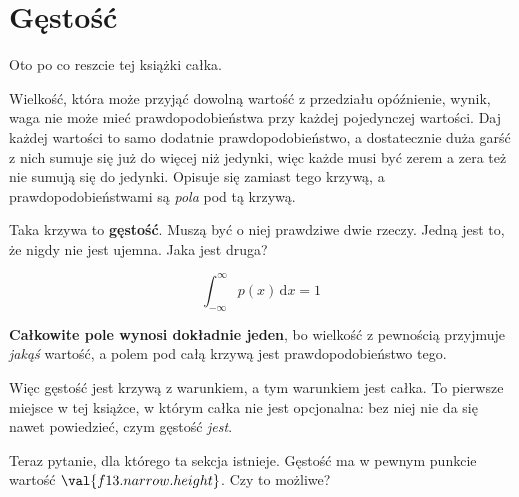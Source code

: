 \section{Gęstość}
\label{sec:F13-density}

\begin{fr}
Oto po co reszcie tej książki całka.

Wielkość, która może przyjąć dowolną wartość z przedziału \dash{} opóźnienie,
wynik, waga \dash{} nie może mieć prawdopodobieństwa przy każdej pojedynczej
wartości. Daj każdej wartości to samo dodatnie prawdopodobieństwo, a
dostatecznie duża garść z nich sumuje się już do więcej niż jedynki, więc
każde musi być zerem \dash{} a zera też nie sumują się do jedynki. Opisuje się
zamiast tego krzywą, a prawdopodobieństwami są \emph{pola} pod tą krzywą.

Taka krzywa to \textbf{gęstość}. Muszą być o niej prawdziwe dwie rzeczy. Jedną
jest to, że nigdy nie jest ujemna. Jaka jest druga?
\nextframe
\end{fr}

\begin{fr}
\begin{ansblock}
\[ \int_{-\infty}^{\infty} p(x)\,\mathrm{d}x = 1 \]
\end{ansblock}

\textbf{Całkowite pole wynosi dokładnie jeden}, bo wielkość z pewnością
przyjmuje \emph{jakąś} wartość, a polem pod całą krzywą jest
prawdopodobieństwo tego.

Więc gęstość jest krzywą z warunkiem, a tym warunkiem jest całka. To pierwsze
miejsce w tej książce, w którym całka nie jest opcjonalna: bez niej nie da się
nawet powiedzieć, czym gęstość \emph{jest}.

Teraz pytanie, dla którego ta sekcja istnieje. Gęstość ma w pewnym punkcie
wartość $\val{f13.narrow.height}$. Czy to możliwe?
\dotline
\nextframe
\end{fr}

